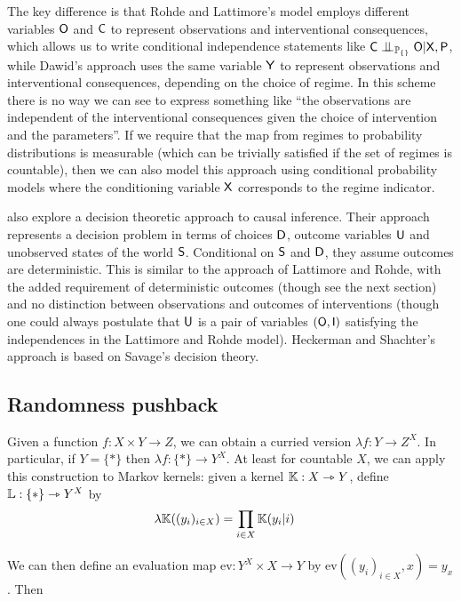 The key difference is that Rohde and Lattimore's model employs different variables $\mathsf{O}$ and $\mathsf{C}$ to represent observations and interventional consequences, which allows us to write conditional independence statements like $\RV{C}\CI_{\prob{P}_{\{\}}} \RV{O}|\RV{X},\RV{P}$, while Dawid's approach uses the same variable $\mathsf{Y}$ to represent observations and interventional consequences, depending on the choice of regime. In this scheme there is no way we can see to express something like ``the observations are independent of the interventional consequences given the choice of intervention and the parameters''. If we require that the map from regimes to probability distributions is measurable (which can be trivially satisfied if the set of regimes is countable), then we can also model this approach using conditional probability models where the conditioning variable $\mathsf{X}$ corresponds to the regime indicator.

\citet{heckerman_decision-theoretic_1995} also explore a decision theoretic approach to causal inference. Their approach represents a decision problem in terms of choices $\mathsf{D}$, outcome variables $\mathsf{U}$ and unobserved states of the world $\mathsf{S}$. Conditional on $\mathsf{S}$ and $\mathsf{D}$, they assume outcomes are deterministic. This is similar to the approach of Lattimore and Rohde, with the added requirement of deterministic outcomes (though see the next section) and no distinction between observations and outcomes of interventions (though one could always postulate that $\mathsf{U}$ is a pair of variables $(\mathsf{O},\mathsf{I})$ satisfying the independences in the Lattimore and Rohde model). Heckerman and Shachter's approach is based on Savage's decision theory.

\subsection{Randomness pushback}\label{sec:curry}

Given a function $f:X\times Y\to Z$, we can obtain a curried version $\lambda f:Y\to Z^X$. In particular, if $Y=\{*\}$ then $\lambda f:\{*\}\to Y^X$. At least for countable $X$, we can apply this construction to Markov kernels: given a kernel $\mathbb{K}:X\rightarrowtriangle Y$, define $\mathbb{L}: \{*\}\rightarrowtriangle Y^X$ by 
\begin{align}
    \lambda \mathbb{K} ((y_i)_{i\in X}) &= \prod_{i\in X} \mathbb{K}(y_i|i)
\end{align}

We can then define an evaluation map $\text{ev}:Y^X\times X\to Y$ by $\text{ev}((y_i)_{i\in X},x)=y_x$. Then

